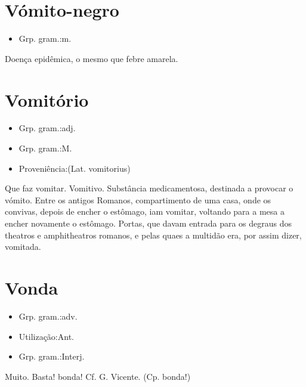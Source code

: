 \documentclass{article}
\begin{document}
\section{Vómito-negro}
\begin{itemize}
\item {Grp. gram.:m.}
\end{itemize}
Doença epidêmica, o mesmo que febre amarela.
\section{Vomitório}
\begin{itemize}
\item {Grp. gram.:adj.}
\end{itemize}
\begin{itemize}
\item {Grp. gram.:M.}
\end{itemize}
\begin{itemize}
\item {Proveniência:(Lat. \textunderscore vomitorius\textunderscore )}
\end{itemize}
Que faz vomitar.
Vomitivo.
Substância medicamentosa, destinada a provocar o vómito.
Entre os antigos Romanos, compartimento de uma casa, onde os convivas, depois de encher o estômago, iam vomitar, voltando para a mesa a encher novamente o estômago.
Portas, que davam entrada para os degraus dos theatros e amphitheatros romanos, e pelas quaes a multidão era, por assim dizer, vomitada.
\section{Vonda}
\begin{itemize}
\item {Grp. gram.:adv.}
\end{itemize}
\begin{itemize}
\item {Utilização:Ant.}
\end{itemize}
\begin{itemize}
\item {Grp. gram.:Interj.}
\end{itemize}
Muito.
Basta! bonda! Cf. G. Vicente.
(Cp. \textunderscore bonda!\textunderscore )
\end{document}
